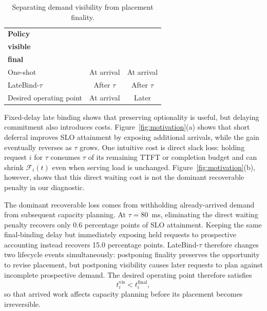 \begin{table}[t]
    \centering
    \small
    \caption{Separating demand visibility from placement finality.}
    \label{tab:problem:operating-points}

    \renewcommand{\arraystretch}{1.25}

    \begin{tabular*}{\columnwidth}{
        @{\extracolsep{\fill}}
        lcc
        @{}
    }
        \toprule
        \textbf{Policy} &
        \makecell{\textbf{Demand}\\\textbf{visible}} &
        \makecell{\textbf{Placement}\\\textbf{final}} \\
        \midrule
        One-shot                & At arrival   & At arrival   \\
        LateBind-$\tau$         & After $\tau$ & After $\tau$ \\
        Desired operating point & At arrival   & Later        \\
        \bottomrule
    \end{tabular*}
\end{table}

Fixed-delay late binding shows that preserving optionality is useful, but
delaying commitment also introduces costs.
Figure~\ref{fig:motivation}(a) shows that short deferral improves SLO attainment
by exposing additional arrivals, while the gain eventually reverses as
$\tau$ grows.
One intuitive cost is direct slack loss: holding request $i$ for $\tau$
consumes $\tau$ of its remaining TTFT or completion budget and can shrink
$\mathcal{F}_i(t)$ even when serving load is unchanged.
Figure~\ref{fig:motivation}(b), however, shows that this direct waiting cost is
not the dominant recoverable penalty in our diagnostic.

The dominant recoverable loss comes from withholding already-arrived demand
from subsequent capacity planning.
At $\tau=80$~ms, eliminating the direct waiting penalty recovers only
0.6 percentage points of SLO attainment.
Keeping the same final-binding delay but immediately exposing held requests to
prospective accounting instead recovers 15.0 percentage points.
LateBind-$\tau$ therefore changes two lifecycle events simultaneously:
postponing finality preserves the opportunity to revise placement, but
postponing visibility causes later requests to plan against incomplete
prospective demand.
The desired operating point therefore satisfies
\begin{equation}
    t_i^{\mathrm{vis}} < t_i^{\mathrm{final}},
    \label{eq:problem:visibility-before-finality}
\end{equation}
so that arrived work affects capacity planning before its placement becomes
irreversible.

